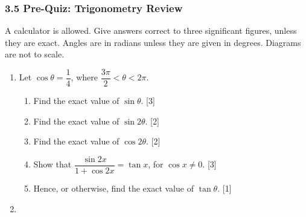 \documentclass[12pt, twoside]{article}
\begin{document}
\subsubsection*{3.5 Pre-Quiz: Trigonometry Review}

A calculator is allowed. Give answers correct to three significant figures,
unless they are exact. Angles are in radians unless they are given in
degrees. Diagrams are not to scale.

\begin{enumerate}[itemsep=0.15cm]

\item[1.] [Maximum mark: 11]

Let $\cos\theta = \dfrac{1}{4}$, where $\dfrac{3\pi}{2} < \theta < 2\pi$.

\begin{enumerate}[itemsep=0.1cm]
  \item Find the exact value of $\sin\theta$. \hfill [3]
  \item Find the exact value of $\sin 2\theta$. \hfill [2]
  \item Find the exact value of $\cos 2\theta$. \hfill [2]
  \item Show that $\dfrac{\sin 2x}{1 + \cos 2x} = \tan x$, for
  $\cos x \neq 0$. \hfill [3]
  \item Hence, or otherwise, find the exact value of $\tan\theta$. \hfill [1]
\end{enumerate}


\newpage

\item[2.] [Maximum mark: 12]


\end{enumerate}
\end{document}
